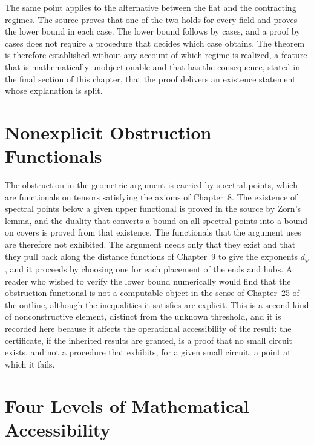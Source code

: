 \documentclass[11pt,letterpaper]{report}
\theoremstyle{plain}
\theoremstyle{definition}
\theoremstyle{remark}
\begin{document}
The same point applies to the alternative between the flat and the contracting regimes. The source proves that one of the two holds for every field and proves the lower bound in each case. The lower bound follows by cases, and a proof by cases does not require a procedure that decides which case obtains. The theorem is therefore established without any account of which regime is realized, a feature that is mathematically unobjectionable and that has the consequence, stated in the final section of this chapter, that the proof delivers an existence statement whose explanation is split.

\section{Nonexplicit Obstruction Functionals}

The obstruction in the geometric argument is carried by spectral points, which are functionals on tensors satisfying the axioms of Chapter~8. The existence of spectral points below a given upper functional is proved in the source by Zorn's lemma, and the duality that converts a bound on all spectral points into a bound on covers is proved from that existence. The functionals that the argument uses are therefore not exhibited. The argument needs only that they exist and that they pull back along the distance functions of Chapter~9 to give the exponents $d_\varphi$, and it proceeds by choosing one for each placement of the ends and hubs. A reader who wished to verify the lower bound numerically would find that the obstruction functional is not a computable object in the sense of Chapter~25 of the outline, although the inequalities it satisfies are explicit. This is a second kind of nonconstructive element, distinct from the unknown threshold, and it is recorded here because it affects the operational accessibility of the result: the certificate, if the inherited results are granted, is a proof that no small circuit exists, and not a procedure that exhibits, for a given small circuit, a point at which it fails.

\section{Four Levels of Mathematical Accessibility}
\end{document}
